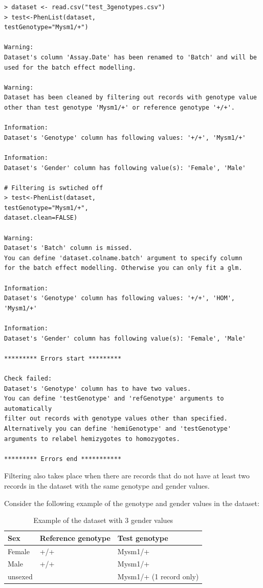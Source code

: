 \documentclass[12pt,a4paper]{article}
\begin{document}
\begingroup
    \fontsize{8pt}{12pt}\selectfont
\begin{verbatim}
> dataset <- read.csv("test_3genotypes.csv")
> test<-PhenList(dataset,
testGenotype="Mysm1/+")

Warning:
Dataset's column 'Assay.Date' has been renamed to 'Batch' and will be used for the batch effect modelling.

Warning:
Dataset has been cleaned by filtering out records with genotype value 
other than test genotype 'Mysm1/+' or reference genotype '+/+'.

Information:
Dataset's 'Genotype' column has following values: '+/+', 'Mysm1/+'

Information:
Dataset's 'Gender' column has following value(s): 'Female', 'Male'

# Filtering is swtiched off
> test<-PhenList(dataset,
testGenotype="Mysm1/+",
dataset.clean=FALSE)

Warning:
Dataset's 'Batch' column is missed.
You can define 'dataset.colname.batch' argument to specify column 
for the batch effect modelling. Otherwise you can only fit a glm.

Information:
Dataset's 'Genotype' column has following values: '+/+', 'HOM', 'Mysm1/+'

Information:
Dataset's 'Gender' column has following value(s): 'Female', 'Male'

********* Errors start *********

Check failed:
Dataset's 'Genotype' column has to have two values.
You can define 'testGenotype' and 'refGenotype' arguments to automatically 
filter out records with genotype values other than specified. 
Alternatively you can define 'hemiGenotype' and 'testGenotype' arguments to relabel hemizygotes to homozygotes.

********* Errors end ***********
\end{verbatim}
\endgroup

Filtering also takes place when there are records that do not have at least two records in the dataset with the same genotype and gender values. 

Consider the following example of the genotype and gender values in the dataset:
\begin{table}[!h]
\begin{center}
\begin{tabular}{| l | l | l | }
  \hline
Sex&Reference genotype&Test genotype\\\hline
Female&+\slash +&Mysm1\slash +\\
Male&+\slash +&Mysm1\slash +\\
unsexed& &Mysm1\slash + (1 record only)\\
\hline  
\end{tabular}
\caption{Example of the dataset with 3 gender values}\label{table:02}
\end{center}
\end{table}
\end{document}
